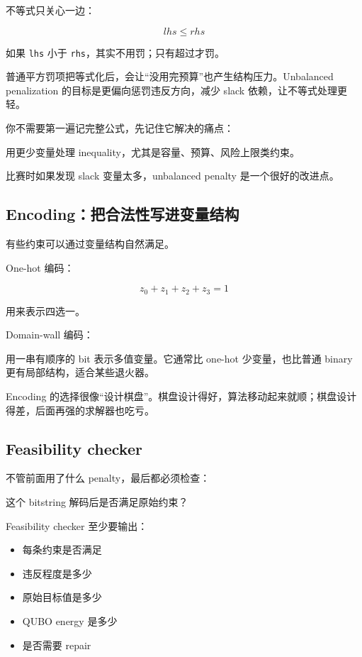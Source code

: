 \documentclass[UTF8,12pt,a4paper]{ctexart}
\begin{document}
不等式只关心一边：

\[
lhs \le rhs
\]

如果 \texttt{lhs} 小于 \texttt{rhs}，其实不用罚；只有超过才罚。

普通平方罚项把等式化后，会让“没用完预算”也产生结构压力。Unbalanced penalization 的目标是更偏向惩罚违反方向，减少 slack 依赖，让不等式处理更轻。

你不需要第一遍记完整公式，先记住它解决的痛点：

\begin{GuideVerbatim}
用更少变量处理 inequality，尤其是容量、预算、风险上限类约束。
\end{GuideVerbatim}

比赛时如果发现 slack 变量太多，unbalanced penalty 是一个很好的改进点。

\subsection*{Encoding：把合法性写进变量结构}

有些约束可以通过变量结构自然满足。

One-hot 编码：

\[
z_{0} + z_{1} + z_{2} + z_{3} = 1
\]

用来表示四选一。

Domain-wall 编码：

用一串有顺序的 bit 表示多值变量。它通常比 one-hot 少变量，也比普通 binary 更有局部结构，适合某些退火器。

Encoding 的选择很像“设计棋盘”。棋盘设计得好，算法移动起来就顺；棋盘设计得差，后面再强的求解器也吃亏。

\subsection*{Feasibility checker}

不管前面用了什么 penalty，最后都必须检查：

\begin{GuideVerbatim}
这个 bitstring 解码后是否满足原始约束？
\end{GuideVerbatim}

Feasibility checker 至少要输出：

\begin{itemize}
\item 每条约束是否满足
\item 违反程度是多少
\item 原始目标值是多少
\item QUBO energy 是多少
\item 是否需要 repair
\end{itemize}
\end{document}
